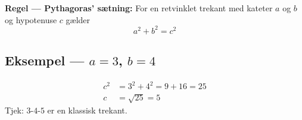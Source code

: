 \begin{regelbox}
\textbf{Regel --- Pythagoras' sætning:} For en retvinklet trekant med
kateter $a$ og $b$ og hypotenuse $c$ gælder
\begin{equation}
a^{2}+b^{2}=c^{2}
\end{equation}
\end{regelbox}

\subsection*{Eksempel --- $a=3$, $b=4$}

\noindent
\begin{align*}
  c^{2} &= 3^{2}+4^{2} = 9+16 = 25 \\
  c &= \sqrt{25} = 5
\end{align*}
Tjek: $3$-$4$-$5$ er en klassisk trekant.
